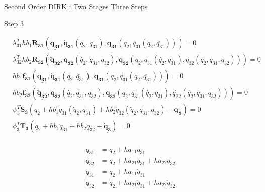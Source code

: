 \documentclass{beamer}
\begin{document}
\begin{frame}[allowframebreaks]{Second Order DIRK : Two Stages Three Steps}
{\begin{block}{Step 3}
  \begin{minipage}{1.0\textwidth}
    \begin{minipage}{0.7\textwidth}
      \begin{equation}\nonumber
        \begin{split}
          &\lambda_{31}^T h b_1 \mathbf{R_{31}}\left(\underline{\mathbf{\ddot{q}_{31}}},
          \mathbf{\dot{q}_{31}}(\dot{q_2},\ddot{q_{31}}),
              \mathbf{{q}_{31}}(q_2,\dot{q_{31}}(\dot{q_2},\ddot{q_{31}}))\right) = 0 \\
          &\lambda_{32}^T h b_2  \mathbf{R_{32}}\left(\underline{\mathbf{\ddot{q}_{32}}},
              \mathbf{\dot{q}_{32}}(\dot{q_2},\ddot{q_{31}},\ddot{q_{32}}),
          \mathbf{{q}_{32}}(q_2,\dot{q_{31}}(\dot{q_2},\ddot{q_{31}}),\dot{q_{32}}(\dot{q_2},\ddot{q_{31}},\ddot{q_{32}}))\right) = 0 \\
          &h b_1 \mathbf{f_{31}}\left(\underline{\mathbf{\ddot{q}_{31}}},
          \mathbf{\dot{q}_{31}}(\dot{q_2},\ddot{q_{31}}),
              \mathbf{{q}_{31}}(q_2,\dot{q_{31}}(\dot{q_2},\ddot{q_{31}}))\right) = 0 \\
          &h b_2 \mathbf{f_{32}}\left(\underline{\mathbf{\ddot{q}_{32}}},
              \mathbf{\dot{q}_{32}}(\dot{q_2},\ddot{q_{31}},\ddot{q_{32}}),
          \mathbf{{q}_{32}}(q_2,\dot{q_{31}}(\dot{q_2},\ddot{q_{31}}),\dot{q_{32}}(\dot{q_2},\ddot{q_{31}},\ddot{q_{32}}))\right) = 0\\
          &\psi_3^T \mathbf{S_3}(q_2 + h b_1 \dot{q}_{31}(\dot{q}_2,\ddot{q_{31}}) +  h b_2 \dot{q}_{32}(\dot{q}_2,\ddot{q_{31}},\ddot{q_{32}}) - \underline{\mathbf{q_3}} ) = 0\\
          &\phi_3^T \mathbf{T_3}(\dot{q}_2 + h b_1 \ddot{q}_{31} +  h b_2 \ddot{q}_{32} - \underline{\mathbf{\dot{q}_3}} ) = 0\\
        \end{split}
      \end{equation}
    \end{minipage}
    \begin{minipage}{0.3\textwidth}
      \begin{equation}\nonumber
        \begin{split}
          q_{31} &= q_2 + h a_{11} \dot{q}_{31} \\
          q_{32} &= q_2 + h a_{21} \dot{q}_{31} + h a_{22} \dot{q}_{32} \\
          \dot{q}_{31} &= \dot{q}_2 + h a_{11} \ddot{q}_{31} \\
          \dot{q}_{32} &= \dot{q}_2 + h a_{21} \ddot{q}_{31} + h a_{22} \ddot{q}_{32} \\
        \end{split}
      \end{equation}
    \end{minipage}
  \end{minipage}
\end{block}
}


\end{frame}
\end{document}
